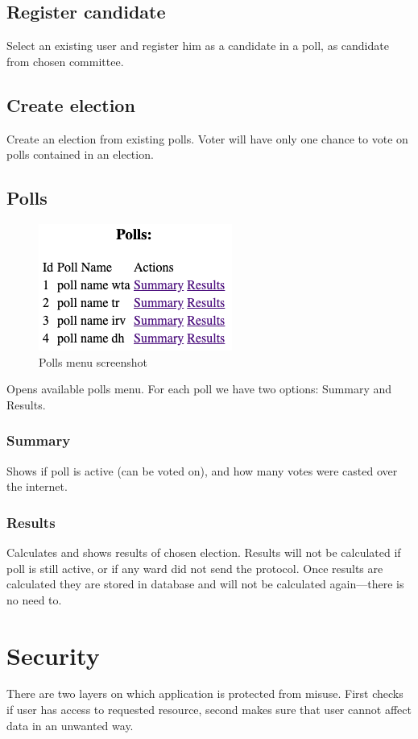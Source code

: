 \documentclass[a4paper,twoside,12pt]{book}
\begin{document}
    \subsection{Register candidate}
      Select an existing user and register him as a candidate in a poll, as candidate from chosen committee.

    \subsection{Create election}
      Create an election from existing polls. Voter will have only one chance to vote on polls contained in an election.

    \subsection{Polls}

      \begin{figure}[h]
        \centering
        \includegraphics[width=0.4\linewidth]{polls_screenshot.png}
        \caption{Polls menu screenshot}
        \label{fig:polls_screenshot}
      \end{figure}

      Opens available polls menu. For each poll we have two options: Summary and Results.

      \subsubsection{Summary}
        Shows if poll is active (can be voted on), and how many votes were casted over the internet.

      \subsubsection{Results}
        Calculates and shows results of chosen election. Results will not be calculated if poll is still active, or if any ward did not send the protocol.
        Once results are calculated they are stored in database and will not be calculated again---there is no need to.

  \section{Security}
    There are two layers on which application is protected from misuse. 
    First checks if user has access to requested resource, second makes sure that user cannot affect data in an unwanted way.
\end{document}
